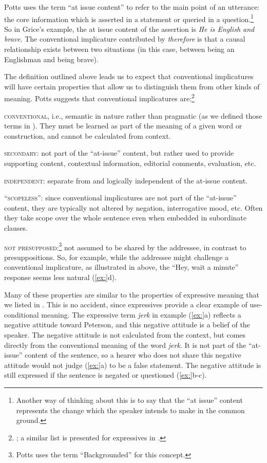 Potts uses the term “at issue content” to refer to the main point of an utterance: the core information which is asserted in a statement or queried in a question.\footnote{Another way of thinking about this is to say that the “at issue” content represents the change which the speaker intends to make in the common ground.} So in Grice’s example, the at issue content of the assertion is \textit{He is English and brave}. The conventional implicature contributed by \textit{therefore} is that a causal relationship exists between two situations (in this case, between being an Englishman and being brave).



The definition outlined above leads us to expect that conventional implicatures will have certain properties that allow us to distinguish them from other kinds of meaning. Potts suggests that conventional implicatures are:\footnote{\citet{Potts2015}; a similar list is presented for expressives in \citet{Potts2007c}.}



\textsc{conventional}, i.e., semantic in nature rather than pragmatic (as we defined those terms in ). They must be learned as part of the meaning of a given word or construction, and cannot be calculated from context.



\textsc{secondary}: not part of the “at-issue” content, but rather used to provide supporting content, contextual information, editorial comments, evaluation, etc.



\textsc{independent}: separate from and logically independent of the at-issue content.



\textsc{“scopeless”:} since conventional implicatures are not part of the “at-issue” content, they are typically not altered by negation, interrogative mood, etc. Often they take scope over the whole sentence even when embedded in subordinate clauses.



\textsc{not presupposed:}\footnote{Potts uses the term “Backgrounded” for this concept.} not assumed to be shared by the addressee, in contrast to presuppositions. So, for example, while the addressee might challenge a conventional implicature, as illustrated in  above, the “Hey, wait a minute” response seems less natural (\ref{ex:}d).



Many of these properties are similar to the properties of expressive meaning that we listed in . This is no accident, since expressives provide a clear example of use-conditional meaning. The expressive term \textit{jerk} in example (\ref{ex:}a) reflects a negative attitude toward Peterson, and this negative attitude is a belief of the speaker. The negative attitude is not calculated from the context, but comes directly from the conventional meaning of the word \textit{jerk}. It is not part of the “at-issue” content of the sentence, so a hearer who does not share this negative attitude would not judge (\ref{ex:}a) to be a false statement. The negative attitude is still expressed if the sentence is negated or questioned (\ref{ex:}b-c).


